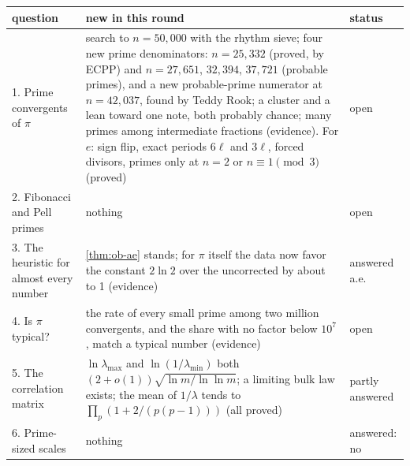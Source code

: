 \noindent\begin{minipage}{\textwidth}
\centering
{}
\label{tab:th-status}
\small
\begin{tabularx}{\textwidth}{lXl}
\toprule
question & new in this round & status \\
\midrule
1. Prime convergents of $\pi$ & search to $n = 50{,}000$ with the rhythm sieve; four new prime denominators: $n = 25{,}332$ (proved, by ECPP) and $n = 27{,}651$, $32{,}394$, $37{,}721$ (probable primes), and a new probable-prime numerator at $n = 42{,}037$, found by Teddy Rook; a cluster and a lean toward one note, both probably chance; many primes among intermediate fractions (evidence). For $e$: sign flip, exact periods $6\ell$ and $3\ell$, forced divisors, primes only at $n = 2$ or $n \equiv 1 \pmod 3$ (proved) & open \\
2. Fibonacci and Pell primes & nothing & open \\
3. The heuristic for almost every number & \cref{thm:ob-ae} stands; for $\pi$ itself the data now favor the constant $2\ln 2$ over the uncorrected \RaNaiveC{} by about \RaFiLR{} to 1 (evidence) & answered a.e. \\
4. Is $\pi$ typical? & the rate of every small prime among two million convergents, and the share with no factor below $10^7$, match a typical number (evidence) & open \\
5. The correlation matrix & $\ln\lambda_{\max}$ and $\ln(1/\lambda_{\min})$ both $(2 + o(1))\sqrt{\ln m/\ln\ln m}$; a limiting bulk law exists; the mean of $1/\lambda$ tends to $\prod_p(1 + 2/(p(p-1)))$ (all proved) & partly answered \\
6. Prime-sized scales & nothing & answered: no \\
\bottomrule
\end{tabularx}
\end{minipage}
\medskip

